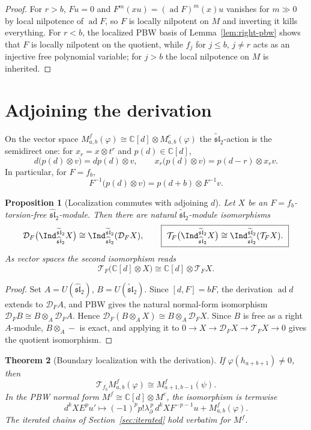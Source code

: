 \documentclass[11pt,a4paper]{article}
\newcommand{\C}{\mathbb C}
\newcommand{\slh}{\widehat{\mathfrak{sl}}_2}
\newcommand{\slt}{\widetilde{\mathfrak{sl}}_2}
\newcommand{\ad}{\operatorname{ad}}
\newcommand{\D}{\mathcal D}
\newcommand{\T}{\mathcal T}
\theoremstyle{plainupright}
\newtheorem{proposition}{Proposition}[section]
\newtheorem{theorem}[proposition]{Theorem}
\begin{document}
\begin{proof}
For \(r>b\), \(Fu=0\) and \(F^m(xu)=(\ad F)^m(x)u\) vanishes for \(m\gg0\)
by local nilpotence of \(\ad F\), so \(F\) is locally nilpotent on \(M\) and
inverting it kills everything. For \(r<b\), the localized PBW basis of
Lemma~\ref{lem:right-pbw} shows that \(F\) is locally nilpotent on the
quotient, while \(f_j\) for \(j\le b\), \(j\ne r\) acts as an injective free
polynomial variable; for \(j>b\) the local nilpotence on \(M\) is inherited.
\end{proof}

\section{Adjoining the derivation}\label{sec:derivation}

On the vector space \(M^f_{a,b}(\varphi)\cong\C[d]\otimes M^c_{a,b}(\varphi)\)
the \(\slt\)-action is the semidirect one: for \(x_r=x\otimes t^r\) and
\(p(d)\in\C[d]\),
\[
d\bigl(p(d)\otimes v\bigr)=dp(d)\otimes v,\qquad
x_r\bigl(p(d)\otimes v\bigr)=p(d-r)\otimes x_rv.
\]
In particular, for \(F=f_b\),
\[
F^{-1}\bigl(p(d)\otimes v\bigr)=p(d+b)\otimes F^{-1}v.
\]

\begin{proposition}[Localization commutes with adjoining \(d\)]
\label{prop:loc-induction}
Let \(X\) be an \(F=f_b\)-torsion-free \(\slh\)-module. Then there are natural
\(\slt\)-module isomorphisms
\[
\D_F\bigl(\Ind_{\slh}^{\slt}X\bigr)\cong\Ind_{\slh}^{\slt}(\D_FX),
\qquad
\boxed{\ \T_F\bigl(\Ind_{\slh}^{\slt}X\bigr)\cong\Ind_{\slh}^{\slt}(\T_FX).\ }
\]
As vector spaces the second isomorphism reads
\[
\T_F\bigl(\C[d]\otimes X\bigr)\cong\C[d]\otimes\T_FX.
\]
\end{proposition}

\begin{proof}
Set \(A=U(\slh)\), \(B=U(\slt)\). Since \([d,F]=bF\), the derivation \(\ad d\)
extends to \(\D_FA\), and PBW gives the natural normal-form isomorphism
\(\D_FB\cong B\otimes_A\D_FA\). Hence
\(\D_F(B\otimes_AX)\cong B\otimes_A\D_FX\). Since \(B\) is free as a right
\(A\)-module, \(B\otimes_A-\) is exact, and applying it to
\(0\to X\to\D_FX\to\T_FX\to0\) gives the quotient isomorphism.
\end{proof}

\begin{theorem}[Boundary localization with the derivation]\label{thm:boundary-f}
If \(\varphi(h_{a+b+1})\ne0\), then
\[
\boxed{\ \T_{f_b}M^f_{a,b}(\varphi)\cong M^f_{a+1,b-1}(\psi).\ }
\]
In the PBW normal form \(M^f\cong\C[d]\otimes M^c\), the isomorphism is termwise
\[
d^kXE^pu'\longmapsto
(-1)^pp!\lambda_\partial^{\,p}\,d^kXF^{-p-1}u+M^f_{a,b}(\varphi).
\]
The iterated chains of Section~\ref{sec:iterated} hold verbatim for \(M^f\).
\end{theorem}
\end{document}

